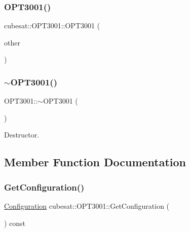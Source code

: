 \subsubsection{\texorpdfstring{O\+P\+T3001()}{OPT3001()}\hspace{0.1cm}{\footnotesize\ttfamily [3/3]}}
{\footnotesize\ttfamily cubesat\+::\+O\+P\+T3001\+::\+O\+P\+T3001 (\begin{DoxyParamCaption}\item[{const \hyperlink{classcubesat_1_1OPT3001}{O\+P\+T3001} \&}]{other }\end{DoxyParamCaption})\hspace{0.3cm}{\ttfamily [delete]}}

\mbox{\label{classcubesat_1_1OPT3001_af852a60be53aa8585ff8d1346ec5fa76}} 
\subsubsection{\texorpdfstring{$\sim$\+O\+P\+T3001()}{~OPT3001()}}
{\footnotesize\ttfamily O\+P\+T3001\+::$\sim$\+O\+P\+T3001 (\begin{DoxyParamCaption}{ }\end{DoxyParamCaption})\hspace{0.3cm}{\ttfamily [virtual]}}



Destructor. 



\subsection{Member Function Documentation}
\mbox{\label{classcubesat_1_1OPT3001_a19a22f506667bae934b78e588db9db70}} 
\subsubsection{\texorpdfstring{Get\+Configuration()}{GetConfiguration()}}
{\footnotesize\ttfamily \hyperlink{unioncubesat_1_1OPT3001_1_1Configuration}{Configuration} cubesat\+::\+O\+P\+T3001\+::\+Get\+Configuration (\begin{DoxyParamCaption}{ }\end{DoxyParamCaption}) const\hspace{0.3cm}{\ttfamily [inline]}}



